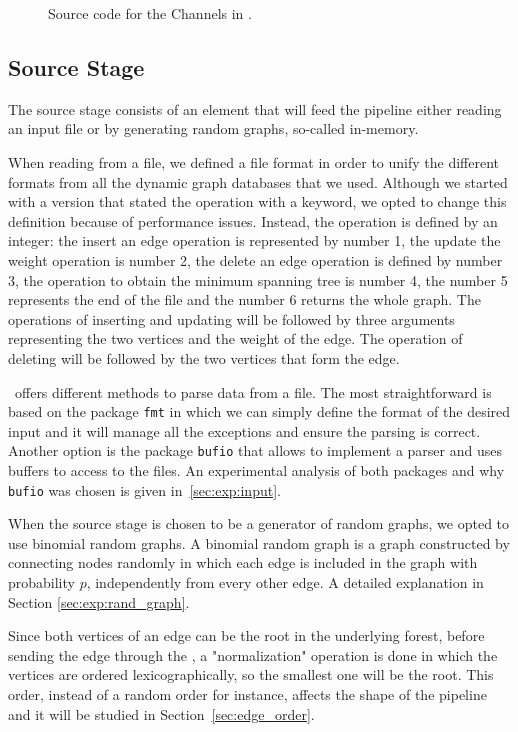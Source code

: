 \begin{figure}[H]
    \centering
    \resizebox{0.4\textwidth}{!}{
    
    }
    \caption{Source code for the Channels in \Go.}
    \label{code:channels}
\end{figure}

\subsection*{Source Stage\label{sec:dp:input}}
The source stage consists of an element that will feed the pipeline either reading an input file or by generating random graphs, so-called in-memory.

When reading from a file, we defined a file format in order to unify the different formats from all the dynamic graph databases that we used. Although we started with a version that stated the operation with a keyword, we opted to change this definition because of performance issues. Instead, the operation is defined by an integer: the insert an edge operation is represented by number 1, the update the weight operation is number 2, the delete an edge operation is defined by number 3, the operation to obtain the minimum spanning tree is number 4, the number 5 represents the end of the file and the number 6 returns the whole graph. The operations of inserting and updating will be followed by three arguments representing the two vertices and the weight of the edge. The operation of deleting will be followed by the two vertices that form the edge.

\Golang\ offers different methods to parse data from a file. The most straightforward is based on the package \verb|fmt| in which we can simply define the format of the desired input and it will manage all the exceptions and ensure the parsing is correct. Another option is the package \verb|bufio| that allows to implement a parser and uses buffers to access to the files. An experimental analysis of both packages and why \verb|bufio| was chosen is given in~\ref{sec:exp:input}.

When the source stage is chosen to be a generator of random graphs, we opted to use binomial random graphs. A binomial random graph is a graph constructed by connecting nodes randomly in which each edge is included in the graph with probability $p$, independently from every other edge. A detailed explanation in Section \ref{sec:exp:rand_graph}.

Since both vertices of an edge can be the root in the underlying forest, before sending the edge through the \DPmst, a "normalization" operation is done in which the vertices are ordered lexicographically, so the smallest one will be the root. This order, instead of a random order for instance, affects the shape of the pipeline and it will be studied in Section~\ref{sec:edge_order}.


